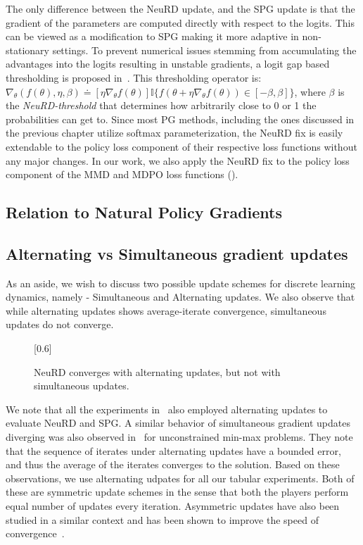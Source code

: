 The only difference between the NeuRD update, and the SPG update is that the gradient of the
parameters are computed directly with respect to the logits.
This can be viewed as a modification to SPG making it more adaptive in non-stationary settings.
To prevent numerical issues stemming from accumulating the advantages into the logits resulting in
unstable gradients, a logit gap based thresholding is proposed in~\cite{hennesNeural2020}.
This thresholding operator is: $\nabla_{\theta}(f(\theta), \eta, \beta) \doteq [\eta\nabla_\theta
		f(\theta)] \mathds{I}\{f(\theta + \eta\nabla_{\theta}f(\theta)) \in [-\beta, \beta]\}$, where
$\beta$ is the \textit{NeuRD-threshold} that determines how arbitrarily close to 0 or 1 the
probabilities can get to.
Since most PG methods, including the ones discussed in the previous chapter utilize softmax
parameterization, the NeuRD fix is easily extendable to the policy loss component of their
respective loss functions without any major changes.
In our work, we also apply the NeuRD fix to the policy loss component of the MMD and MDPO loss
functions ().

\subsection{Relation to Natural Policy Gradients}

\subsection{Alternating vs Simultaneous gradient updates}
As an aside, we wish to discuss two possible update schemes for discrete learning dynamics, namely
- Simultaneous and Alternating updates.
We also observe that while alternating updates shows average-iterate convergence, simultaneous
updates do not converge.
\begin{figure}[H]
	\centering
	\scalebox{0.6}[0.6]{}
	\caption[Simultaneous gradient updates vs Alternate gradient updates updates]{NeuRD converges with alternating updates, but not with simultaneous updates.}
\end{figure}
We note that all the experiments in~\cite{hennesNeural2020} also employed alternating updates to
evaluate NeuRD and SPG.
A similar behavior of simultaneous gradient updates diverging was also observed
in~\cite{gidelVariational2020} for unconstrained min-max problems.
They note that the sequence of iterates under alternating updates have a bounded error, and thus
the average of the iterates converges to the solution.
Based on these observations, we use alternating udpates for all our tabular experiments.
Both of these are symmetric update schemes in the sense that both the players perform equal number
of updates every iteration.
Asymmetric updates have also been studied in a similar context and has been shown to improve the
speed of convergence~\cite{daskalakisTraining2018}.

